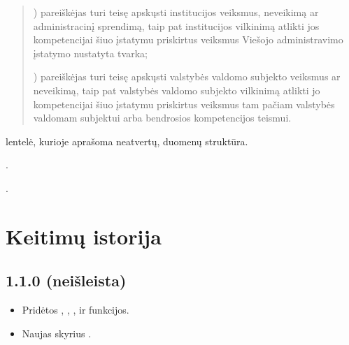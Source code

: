 \documentclass[letterpaper,10pt,lithuanian]{sphinxmanual}
\begin{document}
\begin{description}
\begin{quote}
) pareiškėjas turi teisę apskųsti institucijos veiksmus, neveikimą
ar administracinį sprendimą, taip pat institucijos vilkinimą atlikti
jos kompetencijai šiuo įstatymu priskirtus veiksmus Viešojo
administravimo įstatymo nustatyta tvarka;

) pareiškėjas turi teisę apskųsti valstybės valdomo subjekto
veiksmus ar neveikimą, taip pat valstybės valdomo subjekto vilkinimą
atlikti jo kompetencijai šiuo įstatymu priskirtus veiksmus tam
pačiam valstybės valdomam subjektui arba bendrosios kompetencijos
teismui.
\end{quote}

\sphinxAtStartPar
{\hyperref[\detokenize{savokos:term-DSA}]{}} lentelė, kurioje aprašoma neatvertų, {\hyperref[\detokenize{savokos:term-pirminis-duomenu-saltinis}]{}} duomenų struktūra.

\sphinxAtStartPar
{}.

\sphinxAtStartPar
{}.

\end{description}

\sphinxstepscope


\section{Keitimų istorija}
\label{\detokenize{keitimai:keitimu-istorija}}\label{\detokenize{keitimai:keitimai}}\label{\detokenize{keitimai::doc}}

\subsection{1.1.0 (neišleista)}
\label{\detokenize{keitimai:neisleista}}\begin{itemize}
\item {} 
\sphinxAtStartPar
Pridėtos , , ,  ir 
funkcijos.

\item {} 
\sphinxAtStartPar
Naujas skyrius {\hyperref[\detokenize{modeliai/funkciniai:functional-models}]{}}.

\end{itemize}
\end{document}

